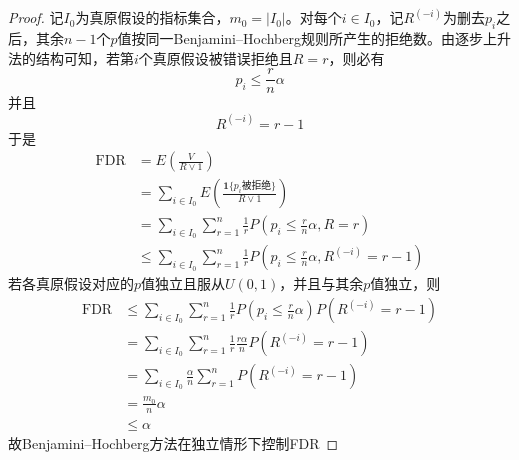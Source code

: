 \begin{proof}
	记$I_0$为真原假设的指标集合，$m_0=|I_0|$。对每个$i\in I_0$，记$R^{(-i)}$为删去$p_i$之后，其余$n-1$个$p$值按同一Benjamini--Hochberg规则所产生的拒绝数。由逐步上升法的结构可知，若第$i$个真原假设被错误拒绝且$R=r$，则必有
	\begin{equation*}
		p_i\leqslant \frac{r}{n}\alpha
	\end{equation*}
	并且
	\begin{equation*}
		R^{(-i)}=r-1
	\end{equation*}
	于是
	\begin{align*}
		\mathrm{FDR}
		&=E\left(\frac{V}{R\vee1}\right)\\
		&=\sum_{i\in I_0}E\left(\frac{\mathbf{1}\{p_i\text{被拒绝}\}}{R\vee1}\right)\\
		&=\sum_{i\in I_0}\sum_{r=1}^n\frac1rP\left(p_i\leqslant \frac{r}{n}\alpha,R=r\right)\\
		&\leqslant \sum_{i\in I_0}\sum_{r=1}^n\frac1rP\left(p_i\leqslant \frac{r}{n}\alpha,R^{(-i)}=r-1\right)
	\end{align*}
	若各真原假设对应的$p$值独立且服从$U(0,1)$，并且与其余$p$值独立，则
	\begin{align*}
		\mathrm{FDR}
		&\leqslant \sum_{i\in I_0}\sum_{r=1}^n\frac1rP\left(p_i\leqslant \frac{r}{n}\alpha\right)P\left(R^{(-i)}=r-1\right)\\
		&=\sum_{i\in I_0}\sum_{r=1}^n\frac1r\frac{r\alpha}{n}P\left(R^{(-i)}=r-1\right)\\
		&=\sum_{i\in I_0}\frac{\alpha}{n}\sum_{r=1}^nP\left(R^{(-i)}=r-1\right)\\
		&=\frac{m_0}{n}\alpha\\
		&\leqslant \alpha
	\end{align*}
	故Benjamini--Hochberg方法在独立情形下控制FDR
\end{proof}

